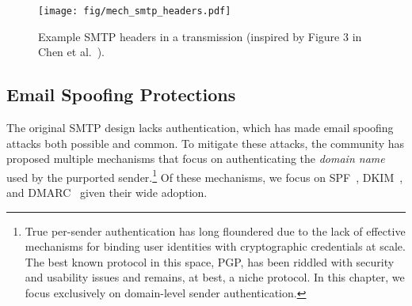 



\begin{figure}[t]
    \centerline{\texttt{[image: fig/mech\_smtp\_headers.pdf]}}
    \centering
    \caption[Example SMTP Headers]{Example SMTP headers in a transmission (inspired by Figure 3 in Chen et al.~\cite{chen2020composition}).}
    \label{fig:mech_smtp_headers}
\end{figure}

\subsection{Email Spoofing Protections}
The original SMTP design lacks authentication, which
has made email spoofing attacks both possible and common. To mitigate these attacks, the community has proposed multiple mechanisms that focus on authenticating the \emph{domain name} used by the
purported sender.\footnote{True per-sender authentication has long floundered
  due to the lack of effective mechanisms for binding user identities
  with cryptographic credentials at scale.  The best known protocol in
  this space, PGP, has been riddled with security and usability issues
  and remains, at best, a niche protocol.  In this chapter, we focus
  exclusively on domain-level sender authentication.} Of these
mechanisms, we focus on SPF~\cite{rfc7208}, DKIM~\cite{rfc6376}, and DMARC~\cite{rfc7489} given their wide adoption.

